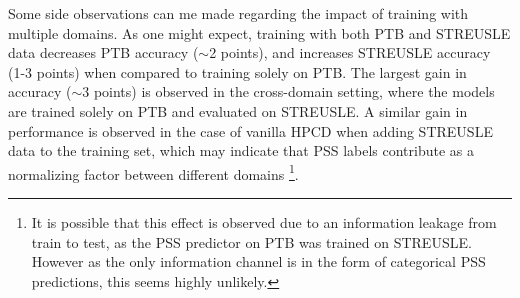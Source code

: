 Some side observations can me made regarding the impact of training with multiple domains. As one might expect, training with both PTB and STREUSLE data decreases PTB accuracy ($\sim$2 points), and increases STREUSLE accuracy (1-3 points) when compared to training solely on PTB. The largest gain in accuracy ($\sim$3 points) is observed in the cross-domain setting, where the models are trained solely on PTB and evaluated on STREUSLE. A similar gain in performance is observed in the case of vanilla HPCD when adding STREUSLE data to the training set, which may indicate that PSS labels contribute as a normalizing factor between different domains \footnote{It is possible that this effect is observed due to an information leakage from train to test, as the PSS predictor on PTB was trained on STREUSLE. However as the only information channel is in the form of categorical PSS predictions, this seems highly unlikely.}.
